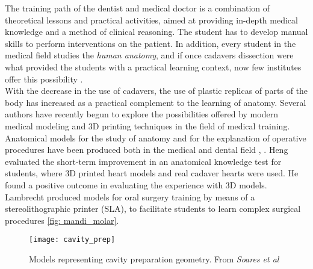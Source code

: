 The training path of the dentist and medical doctor is a combination of theoretical lessons and practical activities, aimed at providing in-depth medical knowledge and a method of clinical reasoning. The student has to develop manual skills to perform interventions on the patient. In addition, every student in the medical field studies the \emph{human anatomy}, and if once cadavers dissection were what provided the students with a practical learning context, now few institutes offer this possibility \parencite{Reference67}. \\
With the decrease in the use of cadavers, the use of plastic replicas of parts of the body has increased as a practical complement to the learning of anatomy. Several authors have recently begun to explore the possibilities offered by modern medical modeling and 3D printing techniques in the field of medical training. \\ Anatomical models for the study of anatomy and for the explanation of operative procedures have been produced both in the medical and dental field \parencite{Reference66}, \parencite{Reference70}. Heng \parencite{Reference67} evaluated the short-term improvement in an anatomical knowledge test for students, where 3D printed heart models and real cadaver hearts were used. He found a positive outcome in evaluating the experience with 3D models. Lambrecht \parencite{Reference69} produced models for oral surgery training by means of a stereolithographic printer (SLA), to facilitate students to learn complex surgical procedures \ref{fig: mandi_molar}.

\begin{figure}[h]
\vspace{-10pt}
	\begin{center}
	\texttt{[image: cavity\_prep]}
    \caption{Models representing cavity preparation geometry. From \emph{Soares et al} \parencite{Reference71}}
    \label{fig:cavity_prep}
    \end{center}
\vspace{-20pt}
\end{figure}
 

